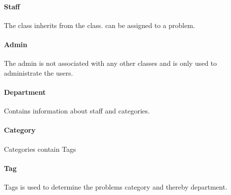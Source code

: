 \paragraph{Staff}
The  class inherits from the  class.
 can be assigned to a problem. 

\paragraph{Admin} The admin is not associated with any other classes and is only used to administrate the users. 

\paragraph{Department}
Contains information about staff and categories. 

\paragraph{Category} Categories contain Tags

\paragraph{Tag} Tags is used to determine the problems category and thereby department. 


